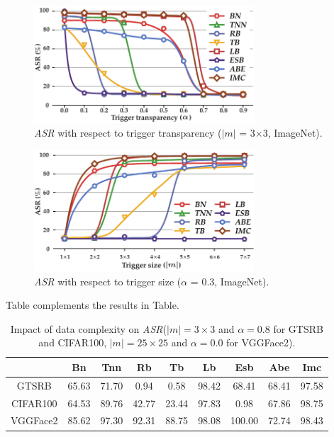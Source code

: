\documentclass[compsoc,conference,a4paper,10pt,times]{IEEEtran}
\newcommand{\bn}{{\sc Bn}\xspace}
\newcommand{\tnn}{{\sc Tnn}\xspace}
\newcommand{\tb}{{\sc Tb}\xspace}
\newcommand{\lb}{{\sc Lb}\xspace}
\newcommand{\esb}{{\sc Esb}\xspace}
\newcommand{\rfb}{{\sc Rb}\xspace}
\newcommand{\abe}{{\sc Abe}\xspace}
\newcommand{\imc}{{\sc Imc}\xspace}
\newcommand{\asr}{{\em \small ASR}\xspace}
\begin{document}
\begin{figure}[!ht]
    \centering
    \includegraphics[width=82mm]{figures/asr-alpha-imagenet.pdf}
    \caption{\asr with respect to trigger transparency ($|m|$ = 3$\times$3, ImageNet). \label{fig:alpha_imagenet}}
\end{figure}

\begin{figure}[!ht]
    \centering
    \includegraphics[width=82mm]{figures/asr-size-imagenet.pdf}
    \caption{\asr with respect to trigger size ($\alpha$ = 0.3, ImageNet). \label{fig:size_imagenet}}
\end{figure}



Table complements the results in Table.

\begin{table}[!ht]{\footnotesize
    \centering
    \renewcommand{\arraystretch}{1.2}
    \setlength{\tabcolsep}{2pt}
    \begin{tabular}{c|c|c|c|c|c|c|c|c}
         & \bn    & \tnn   & \rfb   & \tb    & \lb    & \esb   & \abe  & \imc   \\
         \hline
        GTSRB    & 65.63 & 71.70 & 0.94 & 0.58 & 98.42 & 68.41 & 68.41 & 97.58 \\
        CIFAR100 & 64.53  & 89.76  & 42.77 & 23.44  & 97.83  & 0.98   & 67.86 & 98.75  \\
        VGGFace2 & 85.62 & 97.30 & 92.31 & 88.75 & 98.08 & 100.00    & 72.74 & 98.43 \\
    \end{tabular}
    \caption{Impact of data complexity on \asr ($|m|=3\times 3$ and $\alpha=0.8$ for GTSRB and CIFAR100, $|m|=25\times 25$ and $\alpha=0.0$ for VGGFace2). \label{tab:data-comprison2}}}
\end{table}
    
\end{document}
